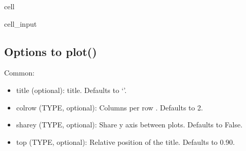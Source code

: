 \documentclass[letterpaper,10pt,english]{jupyterBook}
\begin{document}
\begin{sphinxuseclass}{cell}\begin{sphinxVerbatimInput}

\begin{sphinxuseclass}{cell_input}
\begin{sphinxVerbatim}[commandchars=\\\{\}]

\PYG{p}{[}\PYG{p}{]}
\end{sphinxVerbatim}

\end{sphinxuseclass}\end{sphinxVerbatimInput}

\end{sphinxuseclass}

\subsection{Options to plot()}
\label{\detokenize{content/notebooks/modelflow_features:options-to-plot}}
\sphinxAtStartPar
Common:
\begin{itemize}
\item {} 
\sphinxAtStartPar
title (optional): title. Defaults to ‘’.

\item {} 
\sphinxAtStartPar
colrow (TYPE, optional): Columns per row . Defaults to 2.

\item {} 
\sphinxAtStartPar
sharey (TYPE, optional): Share y axis between plots. Defaults to False.

\item {} 
\sphinxAtStartPar
top (TYPE, optional): Relative position of the title. Defaults to 0.90.

\end{itemize}
\end{document}
